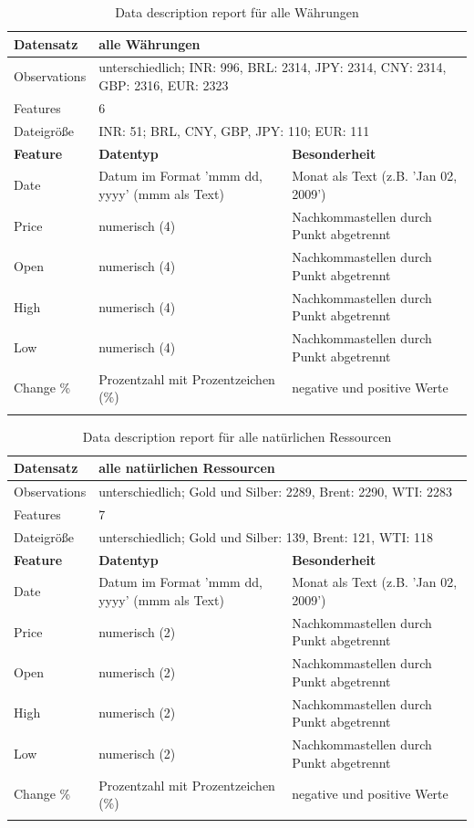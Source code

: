 \begin{longtable}[!h]{|p{5cm}|p{4cm}|p{5cm}|}
\hline
Datensatz & \multicolumn{2}{l|}{alle Währungen} \\ \hline
Observations & \multicolumn{2}{p{9cm}|}{unterschiedlich; INR: 996, BRL: 2314, JPY: 2314, CNY: 2314, GBP: 2316, EUR: 2323}\\ \hline
Features & \multicolumn{2}{l|}{6} \\ \hline
Dateigröße & \multicolumn{2}{l|}{INR: 51; BRL, CNY, GBP, JPY: 110; EUR: 111 } \\ \hline
\hhline{===}
\textbf{Feature} & \textbf{Datentyp} & \textbf{Besonderheit}\\ 
\hhline{===}
Date & Datum im Format 'mmm dd, yyyy' (mmm als Text) & Monat als Text (z.B. 'Jan 02, 2009') \\ \hline
Price & numerisch (4) & Nachkommastellen durch Punkt abgetrennt \\ \hline 
Open &  numerisch (4) & Nachkommastellen durch Punkt abgetrennt \\ \hline 
High &  numerisch (4) & Nachkommastellen durch Punkt abgetrennt \\ \hline 
Low &  numerisch (4) & Nachkommastellen durch Punkt abgetrennt \\ \hline 
Change \% & Prozentzahl mit Prozentzeichen (\%) & negative und positive Werte \\ \hline
\caption{Data description report für alle Währungen}
\end{longtable}

\begin{longtable}[!h]{|p{5cm}|p{4cm}|p{5cm}|}
\hline
Datensatz & \multicolumn{2}{l|}{alle natürlichen Ressourcen} \\ \hline
Observations & \multicolumn{2}{p{9cm}|}{unterschiedlich; Gold und Silber: 2289, Brent: 2290, WTI: 2283}\\ \hline
Features & \multicolumn{2}{l|}{7} \\ \hline
Dateigröße & \multicolumn{2}{l|}{unterschiedlich; Gold und Silber: 139, Brent: 121, WTI: 118} \\ \hline
\hhline{===}
\textbf{Feature} & \textbf{Datentyp} & \textbf{Besonderheit}\\ 
\hhline{===}
Date & Datum im Format 'mmm dd, yyyy' (mmm als Text) & Monat als Text (z.B. 'Jan 02, 2009') \\ \hline
Price & numerisch (2) & Nachkommastellen durch Punkt abgetrennt \\ \hline 
Open &  numerisch (2) & Nachkommastellen durch Punkt abgetrennt \\ \hline 
High &  numerisch (2) & Nachkommastellen durch Punkt abgetrennt \\ \hline 
Low &  numerisch (2) & Nachkommastellen durch Punkt abgetrennt \\ \hline 
Change \% & Prozentzahl mit Prozentzeichen (\%) & negative und positive Werte \\ \hline
\caption{Data description report für alle natürlichen Ressourcen}
\end{longtable}

